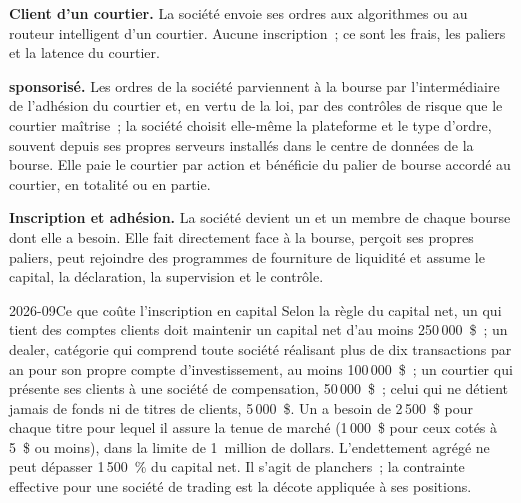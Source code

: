 \textbf{Client d'un courtier.} La société envoie ses ordres aux algorithmes ou
au routeur intelligent d'un courtier. Aucune inscription~; ce sont les frais, les paliers et la latence du courtier.

\textbf{ sponsorisé.} Les ordres de la société parviennent à la
bourse par l'intermédiaire de l'adhésion du courtier et, en vertu de la loi, par des
contrôles de risque que le courtier maîtrise~; la société choisit elle-même la plateforme et le type d'ordre, souvent
depuis ses propres serveurs installés dans le centre de données de la bourse. Elle paie le courtier par
action et bénéficie du palier de bourse accordé au courtier, en totalité ou en partie.

\textbf{Inscription et adhésion.} La société devient un  et un
membre de chaque bourse dont elle a besoin. Elle fait directement face à la bourse, perçoit ses propres
paliers, peut rejoindre des programmes de fourniture de liquidité et assume le capital,
la déclaration, la supervision et le contrôle.

\begin{dated}{2026-09}{Ce que coûte l'inscription en capital}\label{dat:m1:getting-access-equities:netcap}
Selon la règle du capital net, un  qui tient des comptes clients
doit maintenir un capital net d'au moins 250\,000~\$~; un dealer, catégorie qui comprend toute
société réalisant plus de dix transactions par an pour son propre compte d'investissement, au moins
100\,000~\$~; un courtier qui présente ses clients à une société de compensation,
50\,000~\$~; celui qui ne détient jamais de fonds ni de titres de clients, 5\,000~\$. Un
 a besoin de 2\,500~\$ pour chaque titre pour lequel il assure la tenue de marché
(1\,000~\$ pour ceux cotés à 5~\$ ou moins), dans la limite de 1~million de dollars. L'endettement agrégé
ne peut dépasser 1\,500~\% du capital net. Il s'agit de planchers~; la
contrainte effective pour une société de trading est la décote appliquée à ses positions.
\end{dated}

